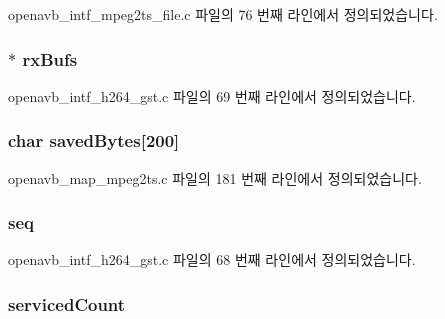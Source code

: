 openavb\+\_\+intf\+\_\+mpeg2ts\+\_\+file.\+c 파일의 76 번째 라인에서 정의되었습니다.

\subsubsection[{\texorpdfstring{rx\+Bufs}{rxBufs}}]{ $\ast$ rx\+Bufs}\hypertarget{structpvt__data__t_a09519ac87178600714ff77d2ab52af61}{}\label{structpvt__data__t_a09519ac87178600714ff77d2ab52af61}


openavb\+\_\+intf\+\_\+h264\+\_\+gst.\+c 파일의 69 번째 라인에서 정의되었습니다.

\subsubsection[{\texorpdfstring{saved\+Bytes}{savedBytes}}]{\setlength{\rightskip}{0pt plus 5cm}char saved\+Bytes\mbox{[}200\mbox{]}}\hypertarget{structpvt__data__t_abf8ba3ccdf4cbc7898575d8b1b8d3655}{}\label{structpvt__data__t_abf8ba3ccdf4cbc7898575d8b1b8d3655}


openavb\+\_\+map\+\_\+mpeg2ts.\+c 파일의 181 번째 라인에서 정의되었습니다.

\subsubsection[{\texorpdfstring{seq}{seq}}]{ seq}\hypertarget{structpvt__data__t_ae362e320c7f4215efa6d55020460d4db}{}\label{structpvt__data__t_ae362e320c7f4215efa6d55020460d4db}


openavb\+\_\+intf\+\_\+h264\+\_\+gst.\+c 파일의 68 번째 라인에서 정의되었습니다.

\subsubsection[{\texorpdfstring{serviced\+Count}{servicedCount}}]{ serviced\+Count}\hypertarget{structpvt__data__t_a024884d69a862ad99333ae7e7c161023}{}\label{structpvt__data__t_a024884d69a862ad99333ae7e7c161023}


